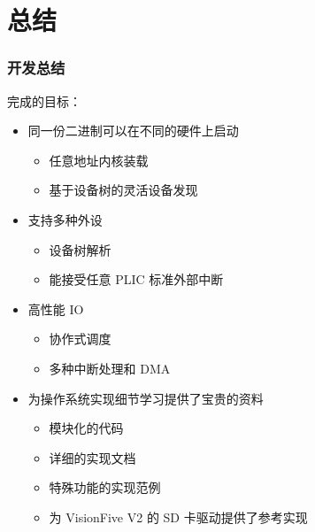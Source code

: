 \section{总结}

\begin{frame}
    \frametitle{开发总结}

    完成的目标：
    \begin{itemize}
        \item 同一份二进制可以在不同的硬件上启动
              \begin{itemize}
                  \item 任意地址内核装载
                  \item 基于设备树的灵活设备发现
              \end{itemize}
        \item 支持多种外设
              \begin{itemize}
                  \item 设备树解析
                  \item 能接受任意 PLIC 标准外部中断
              \end{itemize}
        \item 高性能 IO
              \begin{itemize}
                  \item 协作式调度
                  \item 多种中断处理和 DMA
              \end{itemize}
        \item 为操作系统实现细节学习提供了宝贵的资料
              \begin{itemize}
                  \item 模块化的代码
                  \item 详细的实现文档
                  \item 特殊功能的实现范例
                  \item 为 VisionFive V2 的 SD 卡驱动提供了参考实现
              \end{itemize}
    \end{itemize}

\end{frame}